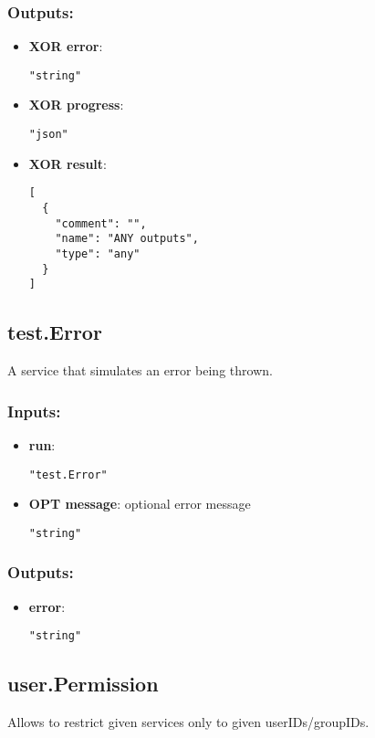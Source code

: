 \subsubsection*{Outputs:}
\begin{itemize}
    \item \textbf{XOR error}: 
\begin{lstlisting}
"string"
\end{lstlisting}
    \item \textbf{XOR progress}: 
\begin{lstlisting}
"json"
\end{lstlisting}
    \item \textbf{XOR result}: 
\begin{lstlisting}
[
  {
    "comment": "", 
    "name": "ANY outputs", 
    "type": "any"
  }
]
\end{lstlisting}
  \end{itemize}

\subsection{test.Error}
A service that simulates an error being thrown.
\subsubsection*{Inputs:}
\begin{itemize}
    \item \textbf{run}: 
\begin{lstlisting}
"test.Error"
\end{lstlisting}
    \item \textbf{OPT message}: optional error message
\begin{lstlisting}
"string"
\end{lstlisting}
  \end{itemize}

\subsubsection*{Outputs:}
\begin{itemize}
    \item \textbf{error}: 
\begin{lstlisting}
"string"
\end{lstlisting}
  \end{itemize}

\subsection{user.Permission}
Allows to restrict given services only to given userIDs/groupIDs.
